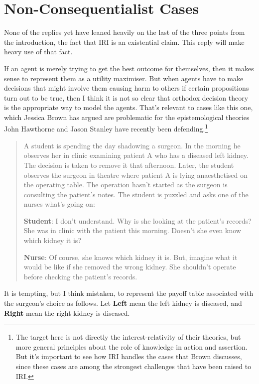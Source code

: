 \section{Non-Consequentialist Cases}
None of the replies yet have leaned heavily on the last of the three points from the introduction, the fact that IRI is an existential claim. This reply will make heavy use of that fact.

If an agent is merely trying to get the best outcome for themselves, then it makes sense to represent them as a utility maximiser. But when agents have to make decisions that might involve them causing harm to others if certain propositions turn out to be true, then I think it is not so clear that orthodox decision theory is the appropriate way to model the agents. That's relevant to cases like this one, which Jessica Brown has argued are problematic for the epistemological theories John Hawthorne and Jason Stanley have recently been defending.\footnote{The target here is not directly the interest-relativity of their theories, but more general principles about the role of knowledge in action and assertion. But it's important to see how IRI handles the cases that Brown discusses, since these cases are among the strongest challenges that have been raised to IRI.}

\begin{quote}
A student is spending the day shadowing a surgeon. In the morning he observes her in clinic examining patient A who has a diseased left kidney. The decision is taken to remove it that afternoon. Later, the student observes the surgeon in theatre where patient A is lying anaesthetised on the operating table. The operation hasn't started as the surgeon is consulting the patient's notes. The student is puzzled and asks one of the nurses what's going on: 

\textbf{Student}: I don't understand. Why is she looking at the patient's records? She was in clinic with the patient this morning. Doesn't she even know which kidney it is? 

\textbf{Nurse}: Of course, she knows which kidney it is. But, imagine what it would be like if she removed the wrong kidney. She shouldn't operate before checking the patient's records. \citep[1144-1145]{Brown2008-BROKAP}
\end{quote}

\noindent It is tempting, but I think mistaken, to represent the payoff table associated with the surgeon's choice as follows. Let \textbf{Left} mean the left kidney is diseased, and \textbf{Right} mean the right kidney is diseased.

